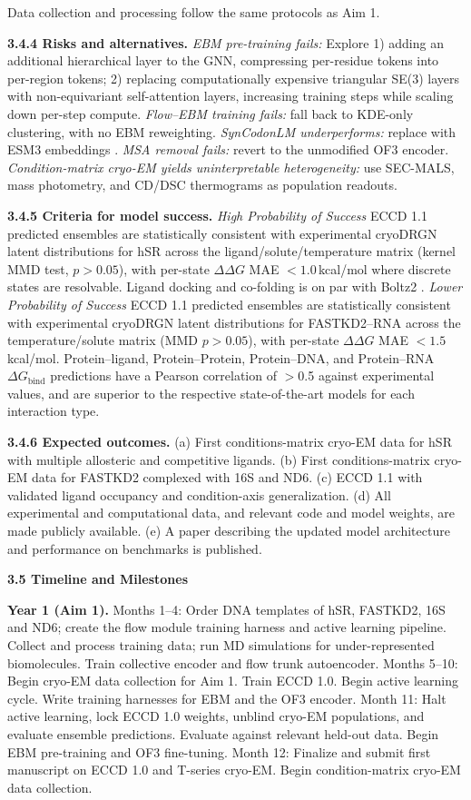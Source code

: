 \documentclass[11pt]{article}
\newcommand{\ECCD}{ECCD\xspace}
\begin{document}
Data collection and processing follow the same protocols as Aim 1.

\textbf{3.4.4 Risks and alternatives.} \emph{EBM pre-training fails:} Explore 1) adding an additional hierarchical layer to the GNN, compressing per-residue tokens into per-region tokens; 2) replacing computationally expensive triangular SE(3) layers with non-equivariant self-attention layers, increasing training steps while scaling down per-step compute. \emph{Flow--EBM training fails:} fall back to KDE-only clustering, with no EBM reweighting. \emph{SynCodonLM underperforms:} replace with ESM3 embeddings \cite{hayes_Simulating_2025}. \emph{MSA removal fails:} revert to the unmodified OF3 encoder. \emph{Condition-matrix cryo-EM yields uninterpretable heterogeneity:} use SEC-MALS, mass photometry, and CD/DSC thermograms as population readouts.

\textbf{3.4.5 Criteria for model success.} \emph{High Probability of Success} \ECCD 1.1 predicted ensembles are statistically consistent with experimental cryoDRGN latent distributions for hSR across the ligand/solute/temperature matrix (kernel MMD test, $p > 0.05$), with per-state $\Delta\Delta G$ MAE $< 1.0$\,kcal/mol where discrete states are resolvable. Ligand docking and co-folding is on par with Boltz2 \cite{passaro_Boltz2_2025}. \emph{Lower Probability of Success} \ECCD 1.1 predicted ensembles are statistically consistent with experimental cryoDRGN latent distributions for FASTKD2--RNA across the temperature/solute matrix (MMD $p > 0.05$), with per-state $\Delta\Delta G$ MAE $< 1.5$\,kcal/mol. Protein--ligand, Protein--Protein, Protein--DNA, and Protein--RNA $\Delta G_{\text{bind}}$ predictions have a Pearson correlation of $>$0.5 against experimental values, and are superior to the respective state-of-the-art models for each interaction type.

\textbf{3.4.6 Expected outcomes.} (a) First conditions-matrix cryo-EM data for hSR with multiple allosteric and competitive ligands. (b) First conditions-matrix cryo-EM data for FASTKD2 complexed with 16S and ND6. (c) \ECCD 1.1 with validated ligand occupancy and condition-axis generalization. (d) All experimental and computational data, and relevant code and model weights, are made publicly available. (e) A paper describing the updated model architecture and performance on benchmarks is published.

\textbf{3.5 Timeline and Milestones}

\textbf{Year 1 (Aim 1).} Months 1--4: Order DNA templates of hSR, FASTKD2, 16S and ND6; create the flow module training harness and active learning pipeline. Collect and process training data; run MD simulations for under-represented biomolecules. Train collective encoder and flow trunk autoencoder. Months 5--10: Begin cryo-EM data collection for Aim 1. Train \ECCD 1.0. Begin active learning cycle. Write training harnesses for EBM and the OF3 encoder. Month 11: Halt active learning, lock \ECCD 1.0 weights, unblind cryo-EM populations, and evaluate ensemble predictions. Evaluate against relevant held-out data. Begin EBM pre-training and OF3 fine-tuning. Month 12: Finalize and submit first manuscript on \ECCD 1.0 and T-series cryo-EM. Begin condition-matrix cryo-EM data collection.
\end{document}
